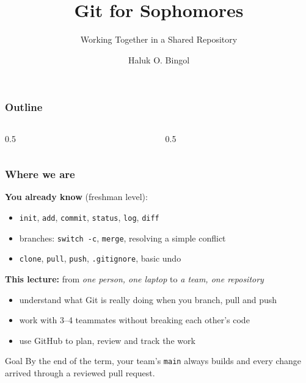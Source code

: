 \documentclass[aspectratio=169,10pt,compress]{beamer}
\title{Git for Sophomores}
\subtitle{Working Together in a Shared Repository}
\author[Bingol]{Haluk O. Bingol}
\institute[FCIS]{
    Faculty of Computer and Information Sciences\\
    Yeditepe University
}
\date{
	{\tiny \hbTimeStamp}
}
\newcommand{\cmd}[1]{\texttt{\color{gitred}#1}}
\begin{document}
\begin{frame}[t,fragile]
  \titlepage
\end{frame}

\begin{frame}[t,fragile] \frametitle{Outline}
  \begin{columns}[T]
    \begin{column}{0.5\textwidth}
      \tableofcontents[sections={1-5}]
    \end{column}
    \begin{column}{0.5\textwidth}
      \tableofcontents[sections={6-10}]
    \end{column}
  \end{columns}
\end{frame}

\begin{frame}[t,fragile] \frametitle{Where we are}
  \textbf{You already know} (freshman level):
  \begin{itemize}
    \item \cmd{init}, \cmd{add}, \cmd{commit}, \cmd{status}, \cmd{log}, \cmd{diff}
    \item branches: \cmd{switch -c}, \cmd{merge}, resolving a simple conflict
    \item \cmd{clone}, \cmd{pull}, \cmd{push}, \texttt{.gitignore}, basic undo
  \end{itemize}

  \vspace{0.5em}
  \textbf{This lecture:} from \emph{one person, one laptop} to \emph{a team, one repository}
  \begin{itemize}
    \item understand what Git is really doing when you branch, pull and push
    \item work with 3--4 teammates without breaking each other's code
    \item use GitHub to plan, review and track the work
  \end{itemize}

  \vspace{0.5em}
  \begin{block}{Goal}
    By the end of the term, your team's \texttt{main} always builds and every
    change arrived through a reviewed pull request.
  \end{block}
\end{frame}
\end{document}
